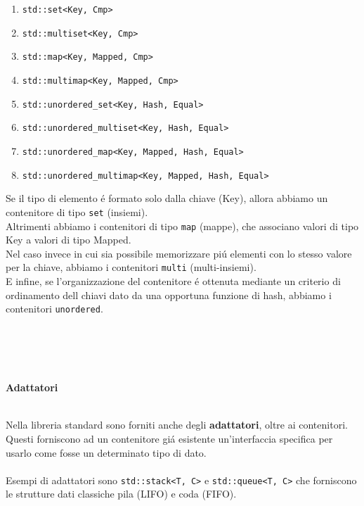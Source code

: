 \documentclass{article}
\begin{document}
\begin{enumerate}
\item \texttt{std::set<Key, Cmp>}
\item \texttt{std::multiset<Key, Cmp>}
\item \texttt{std::map<Key, Mapped, Cmp>}
\item \texttt{std::multimap<Key, Mapped, Cmp>}
\item \texttt{std::unordered\_set<Key, Hash, Equal>}
\item \texttt{std::unordered\_multiset<Key, Hash, Equal>}
\item \texttt{std::unordered\_map<Key, Mapped, Hash, Equal>}
\item \texttt{std::unordered\_multimap<Key, Mapped, Hash, Equal>} \\
\end{enumerate}
Se il tipo di elemento \'e formato solo dalla chiave (Key), allora abbiamo un contenitore di tipo \texttt{set} (insiemi). \\Altrimenti abbiamo i contenitori di tipo \texttt{map} (mappe), che associano valori di tipo Key a valori di tipo Mapped.\\Nel caso invece in cui sia possibile memorizzare pi\'u elementi con lo stesso valore per la chiave, abbiamo i contenitori \texttt{multi} (multi-insiemi).\\E infine, se l'organizzazione del contenitore \'e ottenuta mediante un criterio di ordinamento dell chiavi dato da una opportuna funzione di hash, abbiamo i contenitori \texttt{unordered}.
\\ \\ \\ \\ \\
\begin{large} \textbf{\textcolor{blu}{Adattatori}} \\ \\ \end{large}
Nella libreria standard sono forniti anche degli \textbf{adattatori}, oltre ai contenitori.\\Questi forniscono ad un contenitore gi\'a esistente un'interfaccia specifica per usarlo come fosse un determinato tipo di dato.\\ \\Esempi di adattatori sono \texttt{std::stack<T, C>} e \texttt{std::queue<T, C>} che forniscono le strutture dati classiche pila (LIFO) e coda (FIFO).
\\ \\ \\ \\ \\
\end{document}
